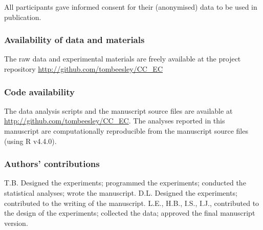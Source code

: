 \documentclass[
  man,
  floatsintext,
  longtable,
  nolmodern,
  notxfonts,
  notimes,
  colorlinks=true,linkcolor=blue,citecolor=blue,urlcolor=blue]{apa7}
\begin{document}
All participants gave informed consent for their (anonymised) data to be
used in publication.

\subsubsection{Availability of data and
materials}\label{availability-of-data-and-materials}

The raw data and experimental materials are freely available at the
project repository \url{http://github.com/tombeesley/CC_EC}

\subsubsection{Code availability}\label{code-availability}

The data analysis scripts and the manuscript source files are available
at \url{http://github.com/tombeesley/CC_EC}. The analyses reported in
this manuscript are computationally reproducible from the manuscript
source files (using R v4.4.0).

\subsubsection{Authors' contributions}\label{authors-contributions}

T.B. Designed the experiments; programmed the experiments; conducted the
statistical analyses; wrote the manuscript. D.L. Designed the
experiments; contributed to the writing of the manuscript. L.E., H.B.,
I.S., I.J., contributed to the design of the experiments; collected the
data; approved the final manuscript version.

\newpage
\end{document}
